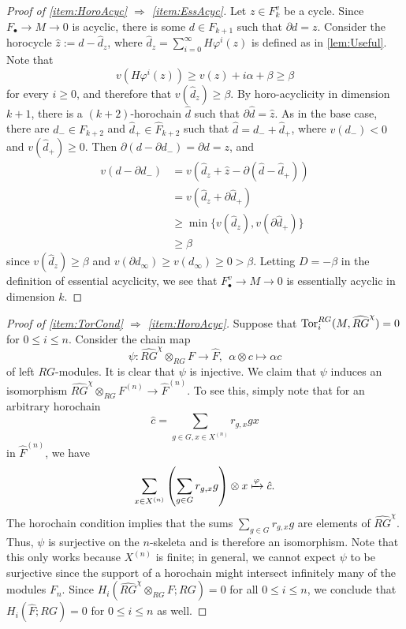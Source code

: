 \documentclass[11pt, letterpaper]{amsart}
\begin{document}
\begin{proof}[Proof of \ref{item:HoroAcyc} $\Longrightarrow$ \ref{item:EssAcyc}]
Let $z \in F^v_{k}$ be a cycle. Since $F_\bullet \longrightarrow M \longrightarrow 0$ is acyclic, there is some $d \in F_{k+1}$ such that $\partial d = z$. Consider the horocycle $\hat{z} := d - \hat{d}_z$, where $\hat{d}_z = \sum_{i = 0}^\infty H\varphi^i(z)$ is defined as in \cref{lem:Useful}. Note that
\[
    v(H\varphi^i(z)) \geqslant v(z) + i\alpha + \beta \geqslant \beta
\]
for every $i \geqslant 0$, and therefore that $v(\hat{d}_z) \geqslant \beta$. By horo-acyclicity in dimension $k+1$, there is a $(k+2)$-horochain $\hat{d}$ such that $\partial \hat{d} = \hat{z}$. As in the base case, there are $d_- \in F_{k+2}$ and $\hat{d}_+ \in \widehat{F}_{k+2}$ such that $\hat{d} = d_- + \hat{d}_+$, where $v(d_-) < 0$ and $v(\hat{d}_+) \geqslant 0$. Then $\partial(d - \partial d_-) = \partial d = z$, and
\begin{align*}
    v(d - \partial d_-) &= v(\hat{d}_z + \hat{z} - \partial(\hat{d} - \hat{d}_+)) \\
        &= v(\hat{d}_z + \partial \hat{d}_+) \\
        &\geqslant \min\{ v(\hat{d}_z), v(\partial \hat{d}_+) \} \\
        &\geqslant \beta
\end{align*}
since $v(\hat{d}_z) \geqslant \beta$ and $v(\partial d_\infty) \geqslant v(d_\infty) \geqslant 0 > \beta$. Letting $D = -\beta$ in the definition of essential acyclicity, we see that $F_\bullet^v \longrightarrow M \longrightarrow 0$ is essentially acyclic in dimension $k$. \qedhere
\end{proof}

\begin{proof}[Proof of \ref{item:TorCond} $\Longrightarrow$ \ref{item:HoroAcyc}] Suppose that $\operatorname{Tor}_i^{RG}(M,\widehat{RG}^\chi) = 0$ for $0 \leqslant i \leqslant n$. Consider the chain map
\[
\psi \colon \widehat{RG}^\chi \otimes_{RG} F \longrightarrow \widehat{F}, \ \ \alpha \otimes c \longmapsto \alpha c
\]
of left $RG$-modules. It is clear that $\psi$ is injective. We claim that $\psi$ induces an isomorphism $\widehat{RG}^\chi \otimes_{RG} F^{(n)} \longrightarrow \widehat{F}^{(n)}$. To see this, simply note that for an arbitrary horochain
\[
    \hat{c} = \sum_{g \in G, x \in X^{(n)}} r_{g,x} gx
\]
in $\widehat{F}^{(n)}$, we have
\[
    \sum_{x \in X^{(n)}}  \left( \sum_{g\in G} r_{g,x} g \right) \otimes x \xmapsto{\varphi} \hat{c}.
\]
The horochain condition implies that the sums $\sum_{g\in G} r_{g,x} g$ are elements of $\widehat{RG}^\chi$. Thus, $\psi$ is surjective on the $n$-skeleta and is therefore an isomorphism. Note that this only works because $X^{(n)}$ is finite; in general, we cannot expect $\psi$ to be surjective since the support of a horochain might intersect infinitely many of the modules $F_n$. Since $H_i(\widehat{RG}^\chi \otimes_{RG} F ; RG) = 0$ for all $0 \leqslant i \leqslant n$, we conclude that $H_i(\widehat{F}; RG) = 0$ for $0 \leqslant i \leqslant n$ as well.
\end{proof}
\end{document}
